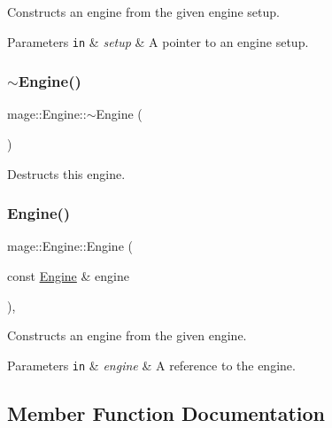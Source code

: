 Constructs an engine from the given engine setup.


\begin{DoxyParams}[1]{Parameters}
\mbox{\tt in}  & {\em setup} & A pointer to an engine setup. \\
\hline
\end{DoxyParams}
\hypertarget{classmage_1_1_engine_a34628556f8397d70ed018d71e343c2f5}{}\label{classmage_1_1_engine_a34628556f8397d70ed018d71e343c2f5} 
\subsubsection{\texorpdfstring{$\sim$\+Engine()}{~Engine()}}
{\footnotesize\ttfamily mage\+::\+Engine\+::$\sim$\+Engine (\begin{DoxyParamCaption}{ }\end{DoxyParamCaption})\hspace{0.3cm}{\ttfamily [virtual]}}

Destructs this engine. \hypertarget{classmage_1_1_engine_afd2f4f32b2e803f59521aafe1924f0ba}{}\label{classmage_1_1_engine_afd2f4f32b2e803f59521aafe1924f0ba} 
\subsubsection{\texorpdfstring{Engine()}{Engine()}\hspace{0.1cm}{\footnotesize\ttfamily [2/2]}}
{\footnotesize\ttfamily mage\+::\+Engine\+::\+Engine (\begin{DoxyParamCaption}\item[{const \hyperlink{classmage_1_1_engine}{Engine} \&}]{engine }\end{DoxyParamCaption})\hspace{0.3cm}{\ttfamily [private]}, {\ttfamily [delete]}}

Constructs an engine from the given engine.


\begin{DoxyParams}[1]{Parameters}
\mbox{\tt in}  & {\em engine} & A reference to the engine. \\
\hline
\end{DoxyParams}


\subsection{Member Function Documentation}
\hypertarget{classmage_1_1_engine_a627271c15bb1ecb1079f9780d64e0d77}{}\label{classmage_1_1_engine_a627271c15bb1ecb1079f9780d64e0d77} 
